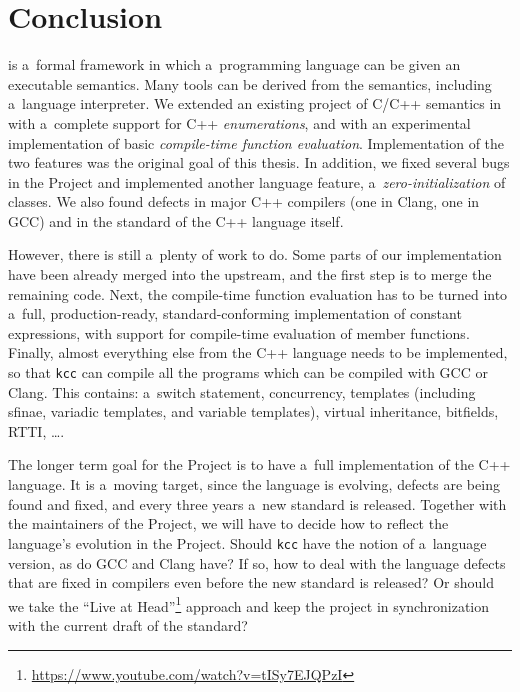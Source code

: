 \documentclass[nolot,nolof,nocover,printed]{fithesis3}
\newcommand{\kcc}{\texttt{kcc}\xspace}
\begin{document}

\chapter{Conclusion}

\K is a~formal framework in which a~programming language can be given an executable semantics. Many tools can be derived from the semantics, including a~language interpreter. We extended an existing project of C/C++ semantics in \K with a~complete support for C++ \textit{enumerations}, and with an experimental implementation of basic \textit{compile-time function evaluation}. Implementation of the two features was the original goal of this thesis. In addition, we fixed several bugs in the Project and implemented another language feature, a~\textit{zero-initialization} of classes. We also found defects in major C++ compilers (one in Clang, one in GCC) and in the standard of the C++ language itself.

However, there is still a~plenty of work to do. Some parts of our implementation have been already merged into the upstream, and the first step is to merge the remaining code. Next, the compile-time function evaluation has to be turned into a~full, production-ready, standard-conforming implementation of constant expressions, with support for compile-time evaluation of member functions. Finally, almost everything else from the C++ language needs to be implemented, so that \kcc can compile all the programs which can be compiled with GCC or Clang. This contains: a~switch statement, concurrency, templates (including sfinae, variadic templates, and variable templates), virtual inheritance, bitfields, RTTI, \ldots .

The longer term goal for the Project is to have a~full implementation of the C++ language. It is a~moving target, since the language is evolving, defects are being found and fixed, and every three years a~new standard is released. Together with the maintainers of the Project, we will have to decide how to reflect the language's evolution in the Project. Should \kcc have the notion of a~language version, as do GCC and Clang have? If so, how to deal with the language defects that are fixed in compilers even before the new standard is released? Or should we take the \enquote{Live at Head}\footnote{\url{https://www.youtube.com/watch?v=tISy7EJQPzI}} approach and keep the project in synchronization with the current draft of the standard?
\end{document}
